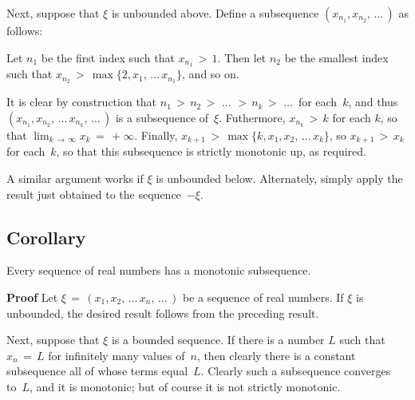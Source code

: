 {       Next, suppose that ${\xi}$ is unbounded above. Define a subsequence $(x_{n_{1}}, x_{n_{2}},\,{\ldots}\,)$ as follows:

\VA

        Let $n_{1}$ be the first index such that $x_{n_{1}}\,>\,1$. Then let $n_{2}$
    be the smallest index such that $x_{n_{2}}\,>\,\max\{2, x_{1}, \,{\ldots}\,x_{n_{1}}\}$, and so on.

    It is clear by construction that $n_{1}\,>\,n_{2}\,>\,\,{\ldots}\,\,>\,n_{k}\,>\,\,{\ldots}\,$ for each~$k$,
    and thus $(x_{n_{1}}, x_{n_{2}},\,{\ldots}\,x_{n_{k}},\,{\ldots}\,)$ is a subsequence of~${\xi}$.
    Futhermore, $x_{n_{k}}\,>\,k$ for each $k$, so that $\lim_{k \,{\rightarrow}\, {\infty}} x_{k} \,=\, +{\infty}$.
    Finally, $x_{k+1}\,>\,\max\{k, x_{1}, x_{2},\,{\ldots}\,x_{k}\}$, so $x_{k+1}\,>\,x_{k}$ for each~$k$,
    so that this subsequence is strictly monotonic up, as required.

        A similar argument works if ${\xi}$ is unbounded below. Alternately, simply apply the result just obtained to the sequence~$-{\xi}$.

\V

            \subsection{\small{\bf Corollary}}
            \label{CorC30.10B}

\V

        Every sequence of real numbers has a monotonic subsequence.

\V

        {\bf Proof} Let ${\xi} \,=\, (x_{1}, x_{2},\,{\ldots}\,x_{n},\,{\ldots}\,)$ be a sequence of real  numbers.
    If ${\xi}$ is unbounded, the desired result follows from the preceding result.

        Next, suppose that ${\xi}$ is a bounded sequence. If there is a number $L$ such that $x_{n} \,=\, L$ for infinitely many values of~$n$,
    then clearly there is a constant subsequence all of whose terms equal~$L$. Clearly such a subsequence converges to~$L$,
    and it is monotonic; but of course it is not strictly monotonic.

}
